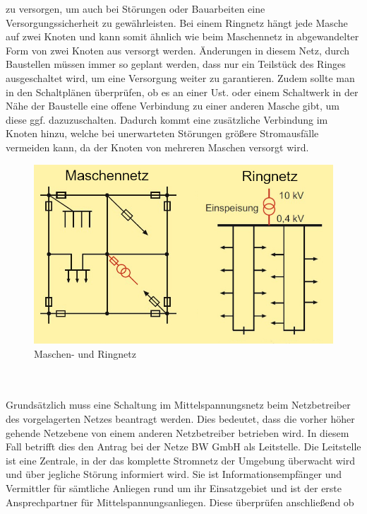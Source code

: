 zu versorgen, um auch bei Störungen oder Bauarbeiten eine Versorgungssicherheit zu gewährleisten. Bei einem Ringnetz hängt jede Masche auf zwei Knoten und 
kann somit ähnlich wie beim Maschennetz in abgewandelter Form von zwei Knoten aus versorgt werden. Änderungen in diesem Netz, \zB durch Baustellen müssen 
immer so geplant werden, dass nur ein Teilstück des Ringes ausgeschaltet wird, um eine Versorgung weiter zu garantieren. Zudem sollte man in den Schaltplänen 
überprüfen, ob es an einer Ust. oder einem Schaltwerk in der Nähe der Baustelle eine offene Verbindung zu einer anderen Masche gibt, um diese ggf. 
dazuzuschalten. Dadurch kommt eine zusätzliche Verbindung im Knoten hinzu, welche bei unerwarteten Störungen größere Stromausfälle vermeiden kann, da der 
Knoten von mehreren Maschen versorgt wird. \autocite{Schwab.2012}
\begin{figure}[hbt]
    \centering
    \includegraphics[width=0.98\linewidth]{images/Ring und Maschennetz}
    \caption[Maschen/Ringnetz]{Maschen- und Ringnetz \autocite{Schwab.2012}}
    \label{fig:Maschen/Ringnetz}
\end{figure}
\\\\
Grundsätzlich muss eine Schaltung im Mittelspannungsnetz beim Netzbetreiber des vorgelagerten Netzes  beantragt werden. Dies bedeutet, dass die vorher höher 
gehende Netzebene von einem anderen Netzbetreiber betrieben wird. In diesem Fall betrifft dies den Antrag bei der Netze BW GmbH als Leitstelle. Die Leitstelle 
ist eine Zentrale, in der das komplette Stromnetz der Umgebung überwacht wird und über jegliche Störung informiert wird. Sie ist Informationsempfänger und 
Vermittler für sämtliche Anliegen rund um ihr Einsatzgebiet und ist der erste Ansprechpartner für Mittelspannungsanliegen. Diese überprüfen anschließend ob 
